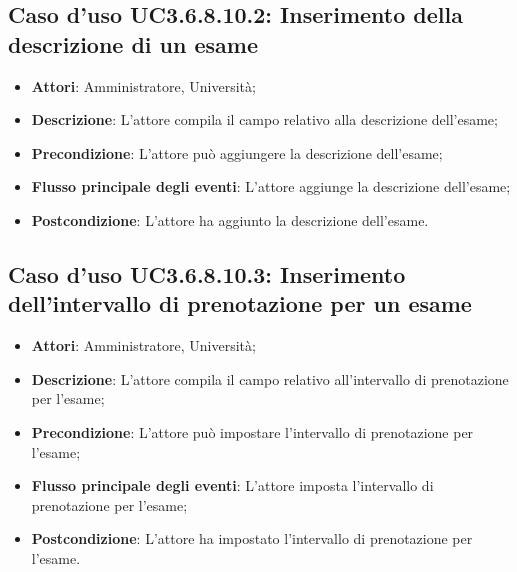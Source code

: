 \subsection{Caso d'uso \texorpdfstring{UC3.6.8.10.2}{UC3.6.8.10.2}: Inserimento della descrizione di un esame}
\begin{itemize}
\item \textbf{Attori}: Amministratore, Università;
\item \textbf{Descrizione}: L'attore compila il campo relativo alla descrizione dell’esame;

\item \textbf{Precondizione}: L'attore può aggiungere la descrizione dell’esame;

\item \textbf{Flusso principale degli eventi}: L'attore aggiunge la descrizione dell’esame;

\item \textbf{Postcondizione}: L'attore ha aggiunto la descrizione dell’esame.

\end{itemize}
\subsection{Caso d'uso \texorpdfstring{UC3.6.8.10.3}{UC3.6.8.10.3}: Inserimento dell’intervallo di prenotazione per un esame}
\begin{itemize}
\item \textbf{Attori}: Amministratore, Università;
\item \textbf{Descrizione}: L'attore compila il campo relativo all'intervallo di prenotazione per l'esame;

\item \textbf{Precondizione}: L'attore può impostare l'intervallo di prenotazione per l’esame;

\item \textbf{Flusso principale degli eventi}: L'attore imposta l'intervallo di prenotazione per l'esame;

\item \textbf{Postcondizione}: L'attore ha impostato l'intervallo di prenotazione per l'esame.

\end{itemize}
